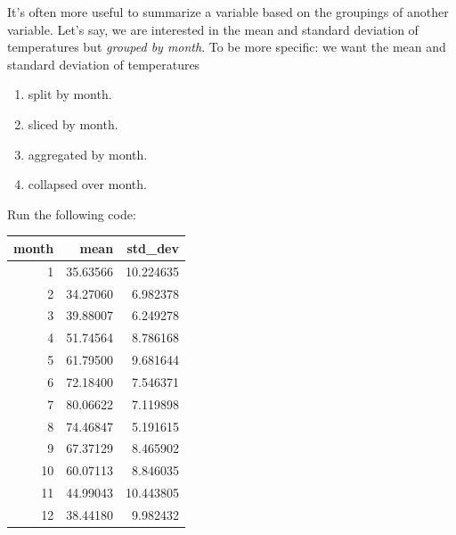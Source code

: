 \documentclass[12pt,]{krantz}
\makeatletter
\newenvironment{Shaded}{\begin{snugshade}}{\end{snugshade}}
\newcommand{\KeywordTok}[1]{\textcolor[rgb]{0.27,0.27,0.27}{\textbf{#1}}}
\newcommand{\DataTypeTok}[1]{\textcolor[rgb]{0.27,0.27,0.27}{#1}}
\newcommand{\StringTok}[1]{\textcolor[rgb]{0.5,0.5,0.5}{#1}}
\newcommand{\OtherTok}[1]{\textcolor[rgb]{0.37,0.37,0.37}{#1}}
\newcommand{\OperatorTok}[1]{\textcolor[rgb]{0.43,0.43,0.43}{\textbf{#1}}}
\newcommand{\NormalTok}[1]{#1}
\providecommand{\tightlist}{%
  \setlength{\itemsep}{0pt}\setlength{\parskip}{0pt}}
\newenvironment{kframe}{%
\medskip{}
\setlength{\fboxsep}{.8em}
 \def\at@end@of@kframe{}%
 \ifinner\ifhmode%
  \def\at@end@of@kframe{\end{minipage}}%
  \begin{minipage}{\columnwidth}%
 \fi\fi%
 \def\FrameCommand##1{\hskip\@totalleftmargin \hskip-\fboxsep
 \colorbox{shadecolor}{##1}\hskip-\fboxsep
     \hskip-\linewidth \hskip-\@totalleftmargin \hskip\columnwidth}%
 \MakeFramed {\advance\hsize-\width
   \@totalleftmargin\z@ \linewidth\hsize
   \@setminipage}}%
 {\par\unskip\endMakeFramed%
 \at@end@of@kframe}
\renewenvironment{Shaded}{\begin{kframe}}{\end{kframe}}
\theoremstyle{definition}
\theoremstyle{definition}
\theoremstyle{definition}
\theoremstyle{remark}
\makeatother
\begin{document}
It's often more useful to summarize a variable based on the groupings of
another variable. Let's say, we are interested in the mean and standard
deviation of temperatures but \emph{grouped by month}. To be more
specific: we want the mean and standard deviation of temperatures

\begin{enumerate}
\def\labelenumi{\arabic{enumi}.}
\tightlist
\item
  split by month.
\item
  sliced by month.
\item
  aggregated by month.
\item
  collapsed over month.
\end{enumerate}

Run the following code:

\begin{Shaded}
\end{Shaded}

\begin{table}[H]
\centering\begingroup\fontsize{10}{12}\selectfont

\begin{tabular}{r|r|r}
\hline
month & mean & std\_dev\\
\hline
1 & 35.63566 & 10.224635\\
\hline
2 & 34.27060 & 6.982378\\
\hline
3 & 39.88007 & 6.249278\\
\hline
4 & 51.74564 & 8.786168\\
\hline
5 & 61.79500 & 9.681644\\
\hline
6 & 72.18400 & 7.546371\\
\hline
7 & 80.06622 & 7.119898\\
\hline
8 & 74.46847 & 5.191615\\
\hline
9 & 67.37129 & 8.465902\\
\hline
10 & 60.07113 & 8.846035\\
\hline
11 & 44.99043 & 10.443805\\
\hline
12 & 38.44180 & 9.982432\\
\hline
\end{tabular}\endgroup{}
\end{table}
\end{document}

